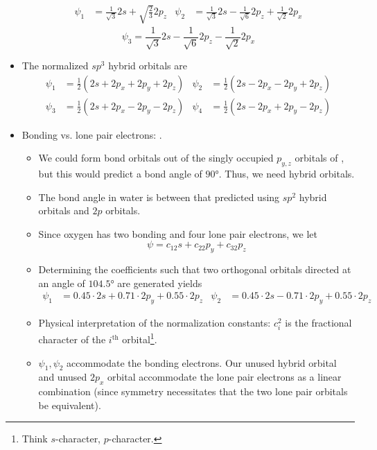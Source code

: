 \documentclass[../notes.tex]{subfiles}
\begin{document}
\begin{itemize}
    \begin{align*}
        \psi_1 &= \frac{1}{\sqrt{3}}2s+\sqrt{\frac{2}{3}}2p_z&
        \psi_2 &= \frac{1}{\sqrt{3}}2s-\frac{1}{\sqrt{6}}2p_z+\frac{1}{\sqrt{2}}2p_x
    \end{align*}
    \begin{equation*}
        \psi_3 = \frac{1}{\sqrt{3}}2s-\frac{1}{\sqrt{6}}2p_z-\frac{1}{\sqrt{2}}2p_x
    \end{equation*}
    \item The normalized $sp^3$ hybrid orbitals are
    \begin{align*}
        \psi_1 &= \frac{1}{2}(2s+2p_x+2p_y+2p_z)&
        \psi_2 &= \frac{1}{2}(2s-2p_x-2p_y+2p_z)
    \end{align*}
    \begin{align*}
        \psi_3 &= \frac{1}{2}(2s+2p_x-2p_y-2p_z)&
        \psi_4 &= \frac{1}{2}(2s-2p_x+2p_y-2p_z)
    \end{align*}
    \item Bonding vs. lone pair electrons: .
    \begin{itemize}
        \item We could form bond orbitals out of the singly occupied $p_{y,z}$ orbitals of , but this would predict a bond angle of $\ang{90}$. Thus, we need hybrid orbitals.
        \item The bond angle in water is between that predicted using $sp^2$ hybrid orbitals and $2p$ orbitals.
        \item Since oxygen has two bonding and four lone pair electrons, we let
        \begin{equation*}
            \psi = c_12s+c_22p_y+c_32p_z
        \end{equation*}
        \item Determining the coefficients such that two orthogonal orbitals directed at an angle of $\ang{104.5}$ are generated yields
        \begin{align*}
            \psi_1 &= 0.45\cdot 2s+0.71\cdot 2p_y+0.55\cdot 2p_z&
            \psi_2 &= 0.45\cdot 2s-0.71\cdot 2p_y+0.55\cdot 2p_z
        \end{align*}
        \item Physical interpretation of the normalization constants: $c_i^2$ is the fractional character of the $i^\text{th}$ orbital\footnote{Think $s$-character, $p$-character.}.
        \item $\psi_1,\psi_2$ accommodate the bonding electrons. Our unused hybrid orbital and unused $2p_x$ orbital accommodate the lone pair electrons as a linear combination (since symmetry necessitates that the two lone pair orbitals be equivalent).

\end{itemize}
\end{itemize}
\end{document}
